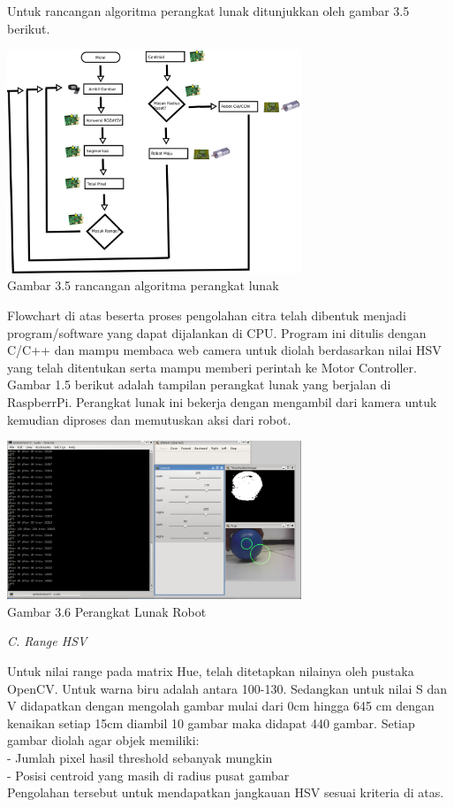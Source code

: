 \documentclass[10pt,journal,compsoc]{IEEEtran}
\begin{document}
  Untuk rancangan algoritma perangkat lunak ditunjukkan oleh gambar 3.5 berikut.
  
  \begin{center}
    \includegraphics[width=250pt]{process}\\
    Gambar 3.5 rancangan algoritma perangkat lunak
  \end{center}
  
  Flowchart di atas beserta proses pengolahan citra telah dibentuk menjadi program/software yang dapat dijalankan di CPU.
  Program ini ditulis dengan C/C++ dan mampu membaca web camera untuk diolah berdasarkan nilai HSV yang telah ditentukan serta mampu memberi perintah ke Motor Controller.
  Gambar 1.5 berikut adalah tampilan perangkat lunak yang berjalan di RaspberrPi. 
  Perangkat lunak ini bekerja dengan mengambil dari kamera untuk kemudian diproses dan memutuskan aksi dari robot.
  
  \begin{center}
    \includegraphics[width=250pt]{softpic}\\
    Gambar 3.6 Perangkat Lunak Robot
  \end{center}
  
  \noindent \textit{C. Range HSV}
  
  Untuk nilai range pada matrix Hue, telah ditetapkan nilainya oleh pustaka OpenCV.
  Untuk warna biru adalah antara 100-130.
  Sedangkan untuk nilai S dan V didapatkan dengan mengolah gambar mulai dari 0cm hingga 645 cm dengan kenaikan setiap 15cm diambil 10 gambar maka didapat 440 gambar.
  Setiap gambar diolah agar objek memiliki:\\
  - Jumlah pixel hasil threshold sebanyak mungkin\\
  - Posisi centroid yang masih di radius pusat gambar\\
 Pengolahan tersebut untuk mendapatkan jangkauan HSV sesuai kriteria di atas.
 
\end{document}

